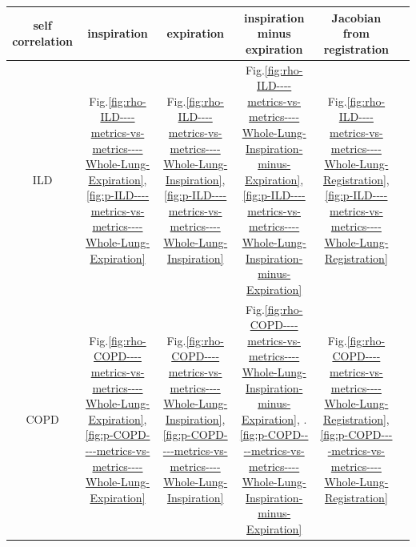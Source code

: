 \documentclass[12pt]{article}
\begin{document}
\noindent
\begin{tabular}{|c||c|c|c|c|c|}
\hline
self correlation & inspiration & expiration & inspiration minus expiration & Jacobian from registration \\
\hline
ILD
& Fig.\ref{fig:rho-ILD----metrics-vs-metrics----Whole-Lung-Expiration}, \ref{fig:p-ILD----metrics-vs-metrics----Whole-Lung-Expiration}
& Fig.\ref{fig:rho-ILD----metrics-vs-metrics----Whole-Lung-Inspiration}, \ref{fig:p-ILD----metrics-vs-metrics----Whole-Lung-Inspiration}
& Fig.\ref{fig:rho-ILD----metrics-vs-metrics----Whole-Lung-Inspiration-minus-Expiration}, \ref{fig:p-ILD----metrics-vs-metrics----Whole-Lung-Inspiration-minus-Expiration}
& Fig.\ref{fig:rho-ILD----metrics-vs-metrics----Whole-Lung-Registration}, \ref{fig:p-ILD----metrics-vs-metrics----Whole-Lung-Registration}
\\
\hline
COPD
& Fig.\ref{fig:rho-COPD----metrics-vs-metrics----Whole-Lung-Expiration}, \ref{fig:p-COPD----metrics-vs-metrics----Whole-Lung-Expiration}
& Fig.\ref{fig:rho-COPD----metrics-vs-metrics----Whole-Lung-Inspiration}, \ref{fig:p-COPD----metrics-vs-metrics----Whole-Lung-Inspiration}
& Fig.\ref{fig:rho-COPD----metrics-vs-metrics----Whole-Lung-Inspiration-minus-Expiration}, .\ref{fig:p-COPD----metrics-vs-metrics----Whole-Lung-Inspiration-minus-Expiration}
& Fig.\ref{fig:rho-COPD----metrics-vs-metrics----Whole-Lung-Registration}, \ref{fig:p-COPD----metrics-vs-metrics----Whole-Lung-Registration}
\\
\hline
\end{tabular} 

\clearpage
\end{document}
